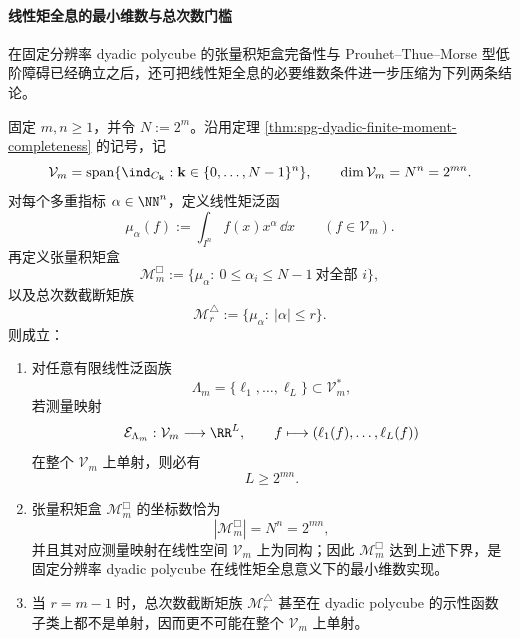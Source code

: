 \paragraph{线性矩全息的最小维数与总次数门槛}
在固定分辨率 dyadic polycube 的张量积矩盒完备性与 Prouhet--Thue--Morse 型低阶障碍已经确立之后，还可把线性矩全息的必要维数条件进一步压缩为下列两条结论。

\begin{theorem}\label{thm:spg-linear-moment-holography-minimal-dimension}
固定 \(m,n\ge 1\)，并令 \(N:=2^m\)。沿用定理 \ref{thm:spg-dyadic-finite-moment-completeness} 的记号，记
\[
\mathcal V_m
=
\operatorname{span}\{\ind_{C_{\mathbf{k}}}:\mathbf{k}\in\{0,\dots,N-1\}^{n}\},
\qquad
\dim \mathcal V_m=N^n=2^{mn}.
\]
对每个多重指标 \(\alpha\in\NN^n\)，定义线性矩泛函
\[
\mu_\alpha(f):=\int_{I^n}f(x)x^\alpha\,\dd x
\qquad (f\in \mathcal V_m).
\]
再定义张量积矩盒
\[
\mathcal M_m^{\Box}
:=
\{\mu_\alpha:\ 0\le \alpha_i\le N-1\ \text{对全部 }i\},
\]
以及总次数截断矩族
\[
\mathcal M_r^{\triangle}
:=
\{\mu_\alpha:\ |\alpha|\le r\}.
\]
则成立：
\begin{enumerate}
  \item 对任意有限线性泛函族
  \[
  \Lambda_m=\{\ell_1,\dots,\ell_L\}\subset \mathcal V_m^\ast,
  \]
  若测量映射
  \[
  \mathcal E_{\Lambda_m}:\mathcal V_m\longrightarrow \RR^L,
  \qquad
  f\longmapsto (\ell_1(f),\dots,\ell_L(f))
  \]
  在整个 \(\mathcal V_m\) 上单射，则必有
  \[
  L\ge 2^{mn}.
  \]
  \item 张量积矩盒 \(\mathcal M_m^{\Box}\) 的坐标数恰为
  \[
  |\mathcal M_m^{\Box}|=N^n=2^{mn},
  \]
  并且其对应测量映射在线性空间 \(\mathcal V_m\) 上为同构；因此 \(\mathcal M_m^{\Box}\) 达到上述下界，是固定分辨率 dyadic polycube 在线性矩全息意义下的最小维数实现。
  \item 当 \(r=m-1\) 时，总次数截断矩族 \(\mathcal M_r^{\triangle}\) 甚至在 dyadic polycube 的示性函数子类上都不是单射，因而更不可能在整个 \(\mathcal V_m\) 上单射。
\end{enumerate}
\end{theorem}
